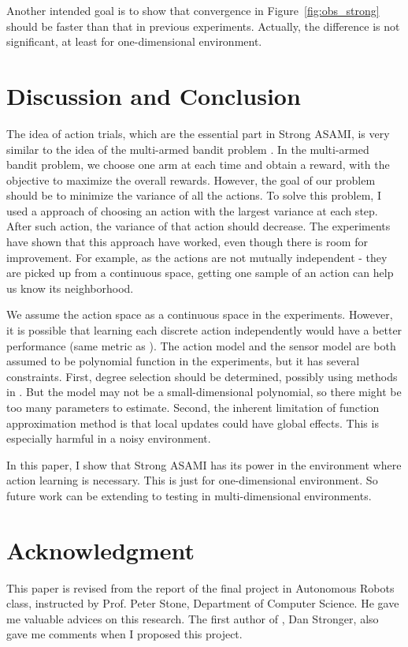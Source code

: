 \documentclass[12pt]{article}
\begin{document}
Another intended goal is to show that convergence in
Figure~\ref{fig:obs_strong} should be faster than that in previous
experiments. Actually, the difference is not significant, at least for
one-dimensional environment.

\section{Discussion and Conclusion}
\label{sec:dis}

The idea of action trials, which are the essential part in Strong
ASAMI, is very similar to the idea of the multi-armed bandit problem
\cite{vermorel2005multi}. In the multi-armed bandit problem, we choose
one arm at each time and obtain a reward, with the objective to
maximize the overall rewards. However, the goal of our problem should
be to minimize the variance of all the actions. To solve this problem,
I used a approach of choosing an action with the largest variance at
each step. After such action, the variance of that action should
decrease. The experiments have shown that this approach have worked, even
though there is room for improvement. For example, as the actions are
not mutually independent - they are picked up from a continuous space,
getting one sample of an action can help us know its neighborhood.

We assume the action space as a continuous space in the experiments.
However, it is possible that learning each discrete action independently would
have a better performance (same metric as
\cite{LNAI2007-ahmadi}). The action model and the sensor model are
both assumed to be polynomial function in the experiments, but it has
several constraints. First, degree selection should be
determined, possibly using methods in \cite{IJAIT08-stronger}. But the
model may not be a small-dimensional polynomial, so there might be
too many parameters to estimate. Second, the inherent limitation of
function approximation method is that local updates could have global
effects. This is especially harmful in a noisy environment.

In this paper, I show that Strong ASAMI has its power in the
environment where action learning is necessary. This is just for
one-dimensional environment. So future work can be extending to
testing in multi-dimensional environments.

\section{Acknowledgment}

This paper is revised from the report of the final project in
Autonomous Robots class,
instructed by Prof. Peter Stone, Department of Computer Science. He
gave me valuable advices on this research. The first author of
\cite{CSJ06}, Dan Stronger, also gave me comments when I proposed this
project.




\end{document}
